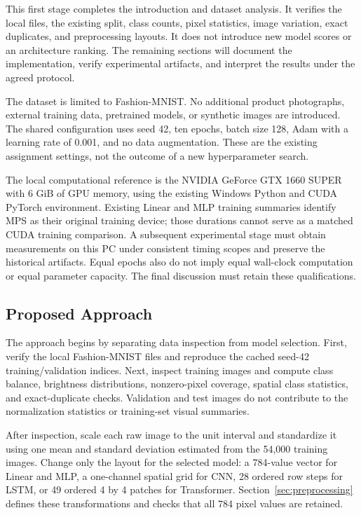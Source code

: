 This first stage completes the introduction and dataset analysis. It verifies
the local files, the existing split, class counts, pixel statistics, image
variation, exact duplicates, and preprocessing layouts. It does not introduce
new model scores or an architecture ranking. The remaining sections will
document the implementation, verify experimental artifacts, and interpret the
results under the agreed protocol.

The dataset is limited to Fashion-MNIST. No additional product photographs,
external training data, pretrained models, or synthetic images are introduced.
The shared configuration uses seed 42, ten epochs, batch size 128, Adam with a
learning rate of 0.001, and no data augmentation. These are the existing
assignment settings, not the outcome of a new hyperparameter search.

The local computational reference is the NVIDIA GeForce GTX 1660 SUPER with
6 GiB of GPU memory, using the existing Windows Python and CUDA PyTorch
environment. Existing Linear and MLP training summaries identify MPS as their
original training device; those durations cannot serve as a matched CUDA
training comparison. A subsequent experimental stage must obtain measurements
on this PC under consistent timing scopes and preserve the historical artifacts.
Equal epochs also do not imply equal wall-clock computation or equal parameter
capacity. The final discussion must retain these qualifications.

\subsection{Proposed Approach}
The approach begins by separating data inspection from model selection.
First, verify the local Fashion-MNIST files and reproduce the cached seed-42
training/validation indices. Next, inspect training images and compute class
balance, brightness distributions, nonzero-pixel coverage, spatial class
statistics, and exact-duplicate checks. Validation and test images do not
contribute to the normalization statistics or training-set visual summaries.

After inspection, scale each raw image to the unit interval and standardize it
using one mean and standard deviation estimated from the 54,000 training images.
Change only the layout for the selected model: a 784-value vector for Linear
and MLP, a one-channel spatial grid for CNN, 28 ordered row steps for LSTM, or
49 ordered 4 by 4 patches for Transformer. Section~\ref{sec:preprocessing}
defines these transformations and checks that all 784 pixel values are retained.


